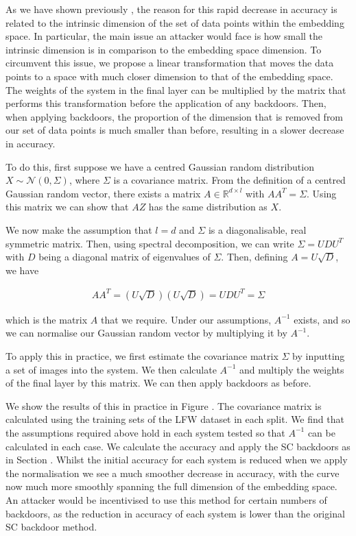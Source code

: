 \documentclass{article}
\theoremstyle{plain}
\theoremstyle{definition}
\theoremstyle{remark}
\begin{document}
As we have shown previously , the reason for this rapid decrease in accuracy is related to the intrinsic dimension of the set of data points within the embedding space. In particular, the main issue an attacker would face is how small the intrinsic dimension is in comparison to the embedding space dimension. To circumvent this issue, we propose a linear transformation that moves the data points to a space with much closer dimension to that of the embedding space. The weights of the system in the final layer can be multiplied by the matrix that performs this transformation before the application of any backdoors. Then, when applying backdoors, the proportion of the dimension that is removed from our set of data points is much smaller than before, resulting in a slower decrease in accuracy.

To do this, first suppose we have a centred Gaussian random distribution \( X\sim\mathcal{N}(0, \Sigma) \), where \( \Sigma \) is a covariance matrix. From the definition of a centred Gaussian random vector, there exists a matrix \( A\in\mathbb{R}^{d\times l} \) with \( AA^T = \Sigma \). Using this matrix we can show that \( AZ \)  has the same distribution as \( X \).

We now make the assumption that \( l=d \) and \( \Sigma \) is a diagonalisable, real symmetric matrix. Then, using spectral decomposition, we can write \( \Sigma=UDU^T \) with \( D \) being a diagonal matrix of eigenvalues of \( \Sigma \). Then, defining \( A=U\sqrt{D} \), we have

\begin{align}
    AA^T = (U\sqrt{D})(U\sqrt{D}) = UDU^T = \Sigma
\end{align}

which is the matrix \( A \) that we require. Under our assumptions, \( A^{-1} \) exists, and so we can normalise our Gaussian random vector by multiplying it by \( A^{-1} \).

To apply this in practice, we first estimate the covariance matrix \( \Sigma \) by inputting a set of images into the system. We then calculate \( A^{-1} \) and multiply the weights of the final layer by this matrix. We can then apply backdoors as before.

We show the results of this in practice in Figure . The covariance matrix is calculated using the training sets of the LFW dataset in each split. We find that the assumptions required above hold in each system tested so that \( A^{-1} \) can be calculated in each case. We calculate the accuracy and apply the SC backdoors as in Section . Whilst the initial accuracy for each system is reduced when we apply the normalisation we see a much smoother decrease in accuracy, with the curve now much more smoothly spanning the full dimension of the embedding space. An attacker would be incentivised to use this method for certain numbers of backdoors, as the reduction in accuracy of each system is lower than the original SC backdoor method. 
\end{document}
